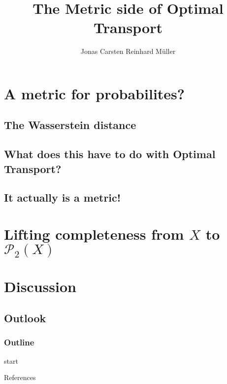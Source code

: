 \documentclass{beamer}
\author[Jonas Müller]{Jonas Carsten Reinhard Müller}
\begin{document}
\title[Wasserstein Metric]{The Metric side of Optimal Transport}
\institute{}
\date{}

\begin{frame}
    \titlepage
\end{frame}


\section{A metric for probabilites?}
\subsection{The Wasserstein distance}
\subsection{What does this have to do with Optimal Transport?}
\subsection{It actually is a metric!}

\section{Lifting completeness from $X$ to $\mathscr{P}_2(X)$}

\section{Discussion}
\subsection{Outlook}


\begin{frame}
    \frametitle{Outline}
    \tableofcontents
\end{frame}




\begin{frame}{}
    start
\end{frame}

\begin{frame}{References}
    \printbibliography
\end{frame}

\end{document}
